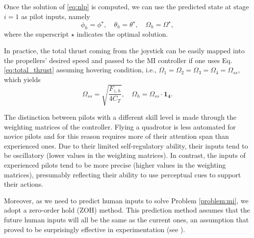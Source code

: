 Once the solution of \eqref{eq:nlp} is computed, we can use the predicted state at stage $i=1$ as pilot inputs, namely
\begin{equation}
	\phi_h = \phi^\star, \quad \theta_h = \theta^\star, \quad \Omega_h = \Omega^\star,
\end{equation}
where the superscript $\star$ indicates the optimal solution.
\begin{remark} In practice, the total thrust coming from the joystick can be easily mapped into the propellers' desired speed and passed to the MI controller if one uses Eq. \eqref{eq:total_thrust} assuming hovering condition, i.e., $\Omega_{1} = \Omega_{2} = \Omega_{3} = \Omega_{4} = \Omega_{ss}$, which yields
\begin{equation*}
	\Omega_{ss} = \sqrt{\frac{F_{z,h}}{4C_T}}, \quad \Omega_h = \Omega_{ss}{\cdot}\mathbf{1_4}.
\end{equation*} 
\end{remark}
The distinction between pilots with a different skill level is made through the weighting matrices of the controller. Flying a quadrotor is less automated for novice pilots and for this reason requires more of their attention span than experienced ones. Due to their limited self-regulatory ability, their inputs tend to be oscillatory (lower values in the weighting matrices). In contrast, the inputs of experienced pilots tend to be more precise (higher values in the weighting matrices), presumably reflecting their ability to use perceptual cues to support their actions.

Moreover, as we need to predict human inputs to solve Problem \ref{problem:mi}, we adopt a zero-order hold (ZOH) method. This prediction method assumes that the future human inputs will all be the same as the current ones, an assumption that proved to be surprisingly effective in experimentation (see \cite{chipalkatty2013}).  